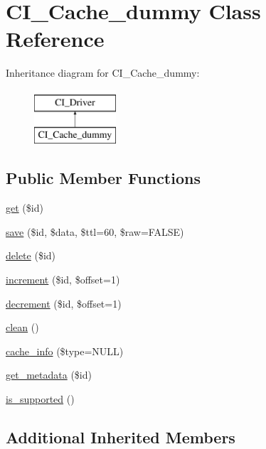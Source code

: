 \hypertarget{class_c_i___cache__dummy}{}\section{C\+I\+\_\+\+Cache\+\_\+dummy Class Reference}
\label{class_c_i___cache__dummy}
Inheritance diagram for C\+I\+\_\+\+Cache\+\_\+dummy\+:\begin{figure}[H]
\begin{center}
\leavevmode
\includegraphics[height=2.000000cm]{class_c_i___cache__dummy}
\end{center}
\end{figure}
\subsection*{Public Member Functions}
\begin{DoxyCompactItemize}
\item 
\hyperlink{class_c_i___cache__dummy_a50e3bfb586b2f42932a6a93f3fbb0828}{get} (\$id)
\item 
\hyperlink{class_c_i___cache__dummy_a472645db04a8ce4b040b789a3062a7d2}{save} (\$id, \$data, \$ttl=60, \$raw=F\+A\+L\+S\+E)
\item 
\hyperlink{class_c_i___cache__dummy_a2f8258add505482d7f00ea26493a5723}{delete} (\$id)
\item 
\hyperlink{class_c_i___cache__dummy_a2f07a4e09b57f4460d49852497d1808f}{increment} (\$id, \$offset=1)
\item 
\hyperlink{class_c_i___cache__dummy_a4eb1c2772c8efc48c411ea060dd040b7}{decrement} (\$id, \$offset=1)
\item 
\hyperlink{class_c_i___cache__dummy_adb40b812890a8bc058bf6b7a0e1a54d9}{clean} ()
\item 
\hyperlink{class_c_i___cache__dummy_aa8b9c4d9f0387156736ccd8850f0727e}{cache\+\_\+info} (\$type=N\+U\+L\+L)
\item 
\hyperlink{class_c_i___cache__dummy_a59635cf18e997c5141bffa05ff7622e0}{get\+\_\+metadata} (\$id)
\item 
\hyperlink{class_c_i___cache__dummy_a98c68fd153468bc148c4ed8c716859fc}{is\+\_\+supported} ()
\end{DoxyCompactItemize}
\subsection*{Additional Inherited Members}


